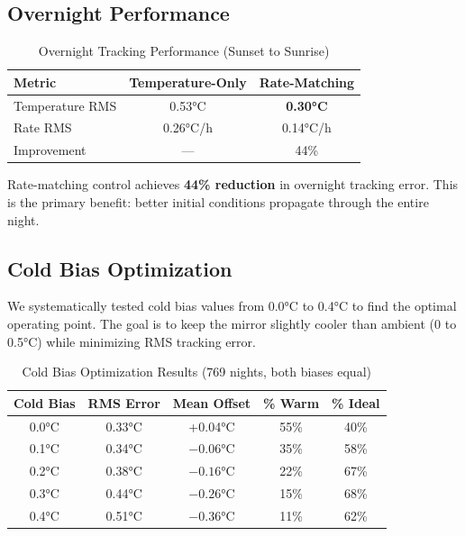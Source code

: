 \documentclass[11pt,letterpaper]{article}
\begin{document}
\subsection{Overnight Performance}

\begin{table}[H]
\centering
\caption{Overnight Tracking Performance (Sunset to Sunrise)}
\label{tab:overnight}
\begin{tabular}{l|cc}
\toprule
\textbf{Metric} & \textbf{Temperature-Only} & \textbf{Rate-Matching} \\
\midrule
\rowcolor{bestcolor}
Temperature RMS & 0.53°C & \textbf{0.30°C} \\
Rate RMS & 0.26°C/h & 0.14°C/h \\
Improvement & --- & 44\% \\
\bottomrule
\end{tabular}
\end{table}

Rate-matching control achieves \textbf{44\% reduction} in overnight tracking error. This is the primary benefit: better initial conditions propagate through the entire night.

\subsection{Cold Bias Optimization}

We systematically tested cold bias values from 0.0°C to 0.4°C to find the optimal operating point. The goal is to keep the mirror slightly cooler than ambient (0 to 0.5°C) while minimizing RMS tracking error.

\begin{table}[H]
\centering
\caption{Cold Bias Optimization Results (769 nights, both biases equal)}
\label{tab:cold_bias}
\begin{tabular}{c|cccc}
\toprule
\textbf{Cold Bias} & \textbf{RMS Error} & \textbf{Mean Offset} & \textbf{\% Warm} & \textbf{\% Ideal} \\
\midrule
0.0°C & 0.33°C & +0.04°C & 55\% & 40\% \\
0.1°C & 0.34°C & $-0.06$°C & 35\% & 58\% \\
0.2°C & 0.38°C & $-0.16$°C & 22\% & 67\% \\
\rowcolor{bestcolor}
0.3°C & 0.44°C & $-0.26$°C & 15\% & 68\% \\
0.4°C & 0.51°C & $-0.36$°C & 11\% & 62\% \\
\bottomrule
\end{tabular}
\end{table}
\end{document}
